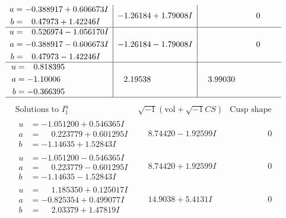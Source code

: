 \documentclass[1p]{elsarticle_modified}
\theoremstyle{definition}
\newcommand{\I}{\sqrt{-1}}
\begin{document}
$$\begin{array}{c|c|c}
\begin{aligned}
a &= -0.388917 + 0.606673 I \\
b &= \phantom{-}0.47973 + 1.42246 I\end{aligned}
 & -1.26184 + 1.79008 I & \phantom{-0.000000 } 0 \\ \hline\begin{aligned}
u &= \phantom{-}0.526974 - 1.056170 I \\
a &= -0.388917 - 0.606673 I \\
b &= \phantom{-}0.47973 - 1.42246 I\end{aligned}
 & -1.26184 - 1.79008 I & \phantom{-0.000000 } 0 \\ \hline\begin{aligned}
u &= \phantom{-}0.818395\phantom{ +0.000000I} \\
a &= -1.10006\phantom{ +0.000000I} \\
b &= -0.366395\phantom{ +0.000000I}\end{aligned}
 & \phantom{-}2.19538\phantom{ +0.000000I} & \phantom{-}3.99030\phantom{ +0.000000I}\\
 \hline 
 \end{array}$$\newpage$$\begin{array}{c|c|c}  
\text{Solutions to }I^u_{1}& \I (\text{vol} + \sqrt{-1}CS) & \text{Cusp shape}\\
 \hline 
\begin{aligned}
u &= -1.051200 + 0.546365 I \\
a &= \phantom{-}0.223779 + 0.601295 I \\
b &= -1.14635 + 1.52843 I\end{aligned}
 & \phantom{-}8.74420 - 1.92599 I & \phantom{-0.000000 } 0 \\ \hline\begin{aligned}
u &= -1.051200 - 0.546365 I \\
a &= \phantom{-}0.223779 - 0.601295 I \\
b &= -1.14635 - 1.52843 I\end{aligned}
 & \phantom{-}8.74420 + 1.92599 I & \phantom{-0.000000 } 0 \\ \hline\begin{aligned}
u &= \phantom{-}1.185350 + 0.125017 I \\
a &= -0.825354 + 0.499077 I \\
b &= \phantom{-}2.03379 + 1.47819 I\end{aligned}
 & \phantom{-}14.9038 + 5.4131 I & \phantom{-0.000000 } 0 \\ \hline\begin{aligned}

\end{aligned}
\end{array}$$
\end{document}
